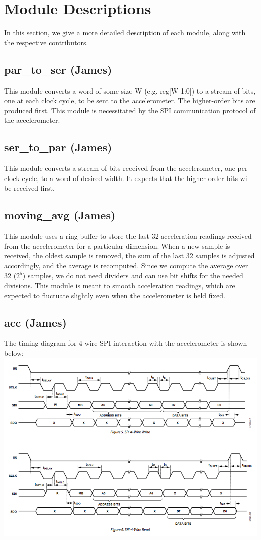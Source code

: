 \documentclass{article}
\begin{document}
\section{Module Descriptions}

In this section, we give a more detailed description of each module, along with the respective contributors.

\subsection{par\_to\_ser (James)}
This module converts a word of some size W (e.g. reg[W-1:0]) to a stream of bits, one at each clock cycle, to be sent to the accelerometer. The higher-order bits are produced first. This module is necessitated by the SPI communication protocol of the accelerometer.

\subsection{ser\_to\_par (James)}
This module converts a stream of bits received from the accelerometer, one per clock cycle, to a word of desired width. It expects that the higher-order bits will be received first.

\subsection{moving\_avg (James)}
This module uses a ring buffer to store the last 32 acceleration readings received from the accelerometer for a particular dimension. When a new sample is received, the oldest sample is removed, the sum of the last 32 samples is adjusted accordingly, and the average is recomputed. Since we compute the average over 32 ($2^5$) samples, we do not need dividers and can use bit shifts for the needed divisions. This module is meant to smooth acceleration readings, which are expected to fluctuate slightly even when the accelerometer is held fixed.

\subsection{acc (James)}
The timing diagram for 4-wire SPI interaction with the accelerometer is shown below:
\includegraphics[width=\textwidth]{img/acc_timing}
\end{document}
